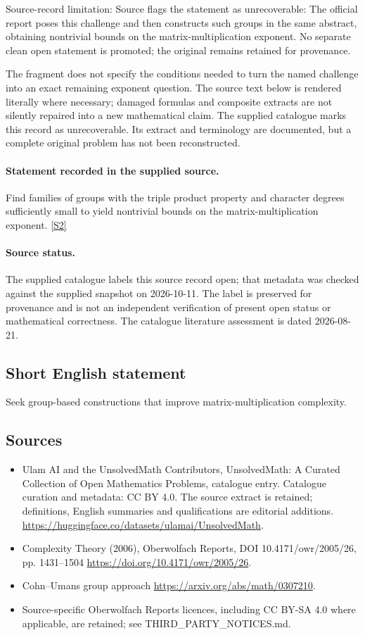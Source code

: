 \documentclass[11pt]{article}
\begin{document}
Source-record limitation: Source flags the statement as unrecoverable: The official report poses this challenge and then constructs such groups in the same abstract, obtaining nontrivial bounds on the matrix-multiplication exponent. No separate clean open statement is promoted; the original remains retained for provenance.

The fragment does not specify the conditions needed to turn the named challenge into an exact remaining exponent question.
The source text below is rendered literally where necessary; damaged formulas and composite extracts are not silently repaired into a new mathematical claim.
The supplied catalogue marks this record as unrecoverable. Its extract and terminology are documented, but a complete original problem has not been reconstructed.
\paragraph{Statement recorded in the supplied source.}
Find families of groups with the triple product property and character degrees sufficiently small to yield nontrivial bounds on the matrix-multiplication exponent. \href{https://doi.org/10.4171/owr/2005/26}{[S2]}
\paragraph{Source status.}
The supplied catalogue labels this source record open; that metadata was checked against the supplied snapshot on 2026-10-11. The label is preserved for provenance and is not an independent verification of present open status or mathematical correctness. The catalogue literature assessment is dated 2026-08-21.
\subsection{Short English statement}
Seek group-based constructions that improve matrix-multiplication complexity.
\subsection{Sources}
\begin{itemize}
\item[S1] Ulam AI and the UnsolvedMath Contributors, UnsolvedMath: A Curated Collection of Open Mathematics Problems, catalogue entry. Catalogue curation and metadata: CC BY 4.0. The source extract is retained; definitions, English summaries and qualifications are editorial additions.
\url{https://huggingface.co/datasets/ulamai/UnsolvedMath}.
\item[S2] Complexity Theory (2006), Oberwolfach Reports, DOI 10.4171/owr/2005/26, pp. 1431--1504
\url{https://doi.org/10.4171/owr/2005/26}.
\item[S3] Cohn--Umans group approach
\url{https://arxiv.org/abs/math/0307210}.
\item Source-specific Oberwolfach Reports licences, including CC BY-SA 4.0 where applicable, are retained; see THIRD\_PARTY\_NOTICES.md.
\end{itemize}
\end{document}
